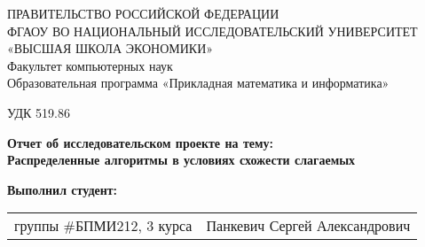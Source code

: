 \begin{titlepage}
\newpage

{
\begin{center}
ПРАВИТЕЛЬСТВО РОССИЙСКОЙ ФЕДЕРАЦИИ\\
ФГАОУ ВО НАЦИОНАЛЬНЫЙ ИССЛЕДОВАТЕЛЬСКИЙ УНИВЕРСИТЕТ\\
«ВЫСШАЯ ШКОЛА ЭКОНОМИКИ»
\\
\bigskip
Факультет компьютерных наук\\
Образовательная программа «Прикладная математика и информатика»
\end{center}
}

\vspace{2em}
УДК 519.86 %
\vspace{4em}

\begin{center}
{\bf Отчет об исследовательском проекте на тему:}\\
{\bf Распределенные алгоритмы в условиях схожести слагаемых}\\
\end{center}

\vspace{2em}

{\bf Выполнил студент: \vspace{2mm}}

{
\begin{tabular}{l@{\hskip 1.5cm}l}
группы \#БПМИ212, 3 курса & Панкевич Сергей Александрович \\
\end{tabular}}



\end{titlepage}
